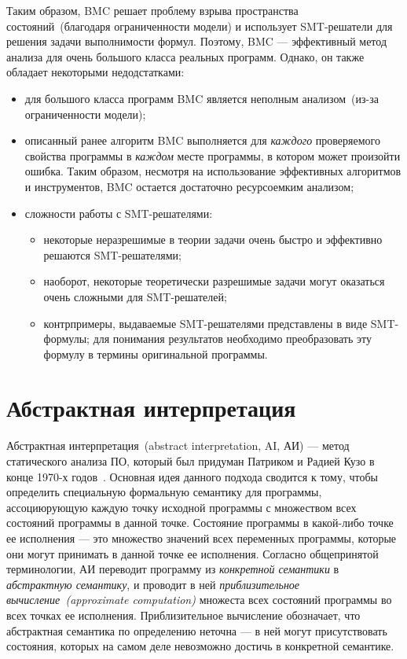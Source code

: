 Таким образом, BMC решает проблему взрыва пространства состояний~(благодаря 
ограниченности модели) и использует SMT-решатели для решения задачи 
выполнимости формул. Поэтому, BMC --- эффективный метод анализа для очень 
большого класса реальных программ. Однако, он также обладает некоторыми 
недодстатками:
\begin{itemize}
\item для большого класса программ BMC является неполным анализом~(из-за 
ограниченности модели);

\item описанный ранее алгоритм BMC выполняется для \textit{каждого} 
проверяемого свойства программы в \textit{каждом} месте программы, в котором 
может произойти ошибка. Таким образом, несмотря на использование эффективных 
алгоритмов и инструментов, BMC остается достаточно ресурсоемким анализом;

\item сложности работы с SMT-решателями:
	\begin{itemize}
	\item некоторые неразрешимые в теории задачи очень быстро и эффективно 
	решаются SMT-решателями;
	\item наоборот, некоторые теоретически разрешимые задачи могут оказаться
	очень сложными для SMT-решателей;
	\item контрпримеры, выдаваемые SMT-решателями представлены в виде 
	SMT-формулы; для понимания результатов необходимо преобразовать эту формулу
	в термины оригинальной программы.
	\end{itemize}
\end{itemize}

\section{Абстрактная интерпретация}

Абстрактная интерпретация~(abstract interpretation, AI, АИ) --- метод 
статического анализа ПО, который был придуман Патриком и Радией Кузо в конце 1970-х годов~\cite{ai}. Основная идея данного подхода сводится к тому, чтобы 
определить специальную формальную семантику для программы, ассоциюрующую 
каждую точку исходной программы с множеством всех состояний программы в данной 
точке. Состояние программы в какой-либо точке ее исполнения --- это множество 
значений всех переменных программы, которые они могут принимать в данной точке 
ее исполнения. Согласно общепринятой терминологии, АИ переводит программу из 
\emph{конкретной семантики} в \emph{абстрактную семантику}, и проводит в ней 
\emph{приблизительное вычисление~(approximate computation)} множеста всех
состояний программы во всех точках ее исполнения. Приблизительное вычисление 
обозначает, что абстрактная семантика по определению неточна --- в ней могут 
присутствовать состояния, которых на самом деле невозможно достичь в 
конкретной семантике.


